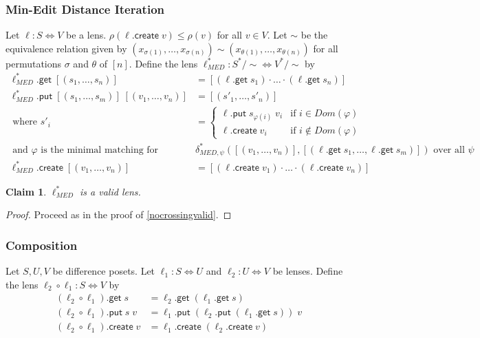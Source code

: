 \documentclass[acmsmall,review,anonymous]{acmart}\settopmatter{printfolios=true,printccs=false,printacmref=false}
\newtheorem{claim}{Claim}
\newcommand{\kw}[1]{\ensuremath{\mathsf{#1}}}
\newcommand{\get}{\ensuremath{\kw{get}}}
\newcommand{\pput}{\ensuremath{\kw{put}}}
\newcommand{\create}{\ensuremath{\kw{create}}}
\begin{document}
\subsubsection{Min-Edit Distance Iteration}
Let $\ell: S \Leftrightarrow V$ be a lens. $\rho(\ell.\create \;
v) \leq \rho(v)$ for all $v \in V$. Let $\sim$ be the equivalence relation
given by $(x_{\sigma(1)}, \ldots, x_{\sigma(n)}) \sim (x_{\theta(1)},
\ldots, x_{\theta(n)})$ for all permutations $\sigma$ and $\theta$ of
$[n]$. Define the lens $\ell^*_{MED}: S^*/{\sim} \Leftrightarrow V^*/{\sim}$ by
\begin{align*}
\ell^*_{MED} .\get \; [(s_1, \ldots, s_n)] &= [(\ell.\get \; s_1) \cdot \ldots
\cdot (\ell.\get \; s_n)]\\
\ell^*_{MED} .\pput \; [(s_1, \ldots, s_m)] \; [(v_1, \ldots, v_n)] &= [(s'_1,
\ldots , s'_n)]\\
\text{ where } s'_i &= \begin{cases}
\ell.\pput \; s_{\varphi(i)} \; v_i & \text{if } i \in Dom(\varphi)\\
\ell.\create \; v_i & \text{if } i \not \in Dom(\varphi)
\end{cases}\\
\text{ and } \varphi \text{ is the minimal matching for }
&\delta^*_{MED, \psi}([(v_1, \ldots, v_n)], [(\ell.\get \; s_1, \ldots,
\ell.\get \; s_m)])\text{ over all }\psi\\
\ell^*_{MED}.\create \; [(v_1, \ldots, v_n)] &= [(\ell.\create
\; v_1) \cdot \ldots \cdot (\ell.\create \; v_n)]
\end{align*}
\begin{claim}
$\ell^*_{MED}$ is a valid lens.
\end{claim}
\begin{proof}
Proceed as in the proof of \cref{nocrossingvalid}.
\end{proof}
\subsubsection{Composition}

Let $S, U, V$ be difference posets. Let $\ell_1 : S \Leftrightarrow U$
and $\ell_2 : U \Leftrightarrow V$ be lenses. Define the lens $\ell_2
\circ \ell_1 : S \Leftrightarrow V$ by
\begin{align*}
(\ell_2 \circ \ell_1).\get \; s &= \ell_2.\get \; (\ell_1.\get \; s)\\
(\ell_2 \circ \ell_1).\pput \; s \; v &= \ell_1.\pput \; (\ell_2.\pput \;
(\ell_1.\get \; s)) \; v\\
(\ell_2 \circ \ell_1).\create \; v &= \ell_1.\create \; (\ell_2.\create \; v)
\end{align*}
\end{document}
